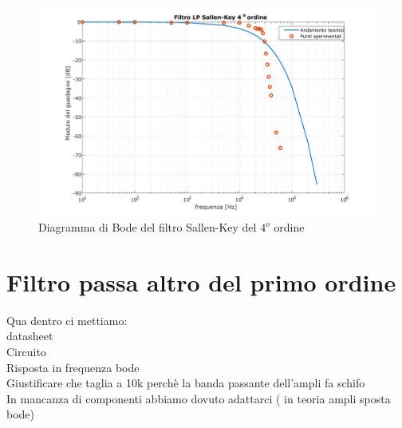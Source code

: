 \documentclass[titlepage]{report}
\begin{document}
	\begin{figure}[h]
			\centering
			\includegraphics[scale=0.7]{Immagini/bode_lp4.pdf}
			\caption{Diagramma di Bode del filtro Sallen-Key del $4^o$ ordine}
			\label{fig:BODELp4Real}
		\end{figure}
	
	
	     

		
     	

\newpage
\section{Filtro passa altro del primo ordine}
		Qua dentro ci mettiamo: \\
		datasheet \\
		Circuito \\
		Risposta in frequenza bode \\
		Giustificare che taglia a 10k perchè la banda passante dell'ampli fa schifo \\

		In mancanza di componenti abbiamo dovuto adattarci
		( in teoria ampli sposta bode)
\end{document}
